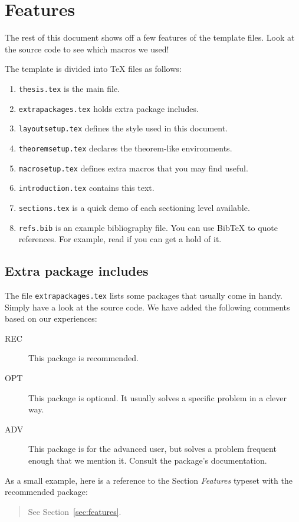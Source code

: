 \section{Features}
\label{sec:features}

The rest of this document shows off a few features of the template
files.  Look at the source code to see which macros we used!

The template is divided into \TeX{} files as follows:
\begin{enumerate}
\item \texttt{thesis.tex} is the main file.
\item \texttt{extrapackages.tex} holds extra package includes.
\item \texttt{layoutsetup.tex} defines the style used in this document.
\item \texttt{theoremsetup.tex} declares the theorem-like environments.
\item \texttt{macrosetup.tex} defines extra macros that you may find
  useful.
\item \texttt{introduction.tex} contains this text.
\item \texttt{sections.tex} is a quick demo of each sectioning level
  available.
\item \texttt{refs.bib} is an example bibliography file.  You can use
  Bib\TeX{} to quote references.  For example, read
  \cite{bringhurst1996ets} if you can get a hold of it.
\end{enumerate}


\subsection{Extra package includes}

The file \texttt{extrapackages.tex} lists some packages that usually
come in handy.  Simply have a look at the source code.  We have
added the following comments based on our experiences:
\begin{description}
\item[REC] This package is recommended.
\item[OPT] This package is optional.  It usually solves a specific
  problem in a clever way.
\item[ADV] This package is for the advanced user, but solves a problem
  frequent enough that we mention it. Consult the package's
  documentation.
\end{description}

As a small example, here is a reference to the Section \emph{Features}
typeset with the recommended  package:
\begin{quote}
  See Section~\vref{sec:features}.
\end{quote}


